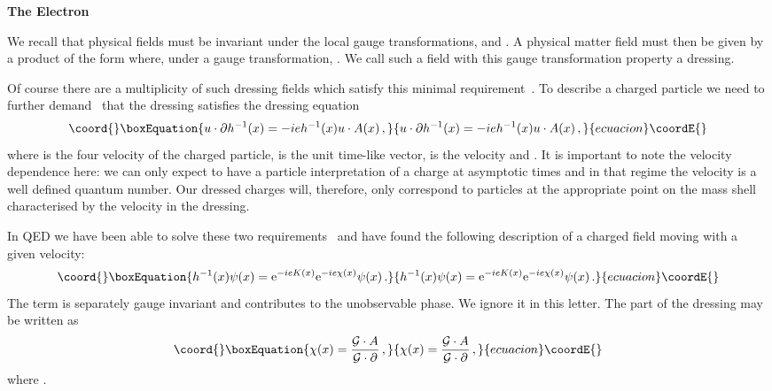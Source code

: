 \documentclass[12pt,a4paper]{article}
\providecommand{\no}{\noindent}
\providecommand{\cd}{\cdot}
\providecommand{\pa}{\partial}
\providecommand{\G}{{\cal G}}
\providecommand{\ee}{\mathrm{e}}
\providecommand{\vb}{{\boldsymbol v}}
\begin{document}
\bigskip

\noindent \no \textbf{The Electron}

\smallskip

\no We  recall that physical fields must be invariant under the local gauge
transformations, \coordHE{} and
\myHighlight{$\psi(x)\to \ee^{ie\theta(x)}\psi(x)$}\coordHE{}. A physical matter field must
then be given by a product of the form \coordHE{} where,
under a gauge transformation, \myHighlight{$h^{-1}(x)
\to h^{-1}(x) \ee^{-ie\theta(x)}$}\coordHE{}. We call such a field with this
gauge transformation property a dressing.


Of course there are a multiplicity of such dressing fields which
satisfy this minimal
requirement~\cite{Dirac:1955ca,Lavelle:1997ty}. To describe a
charged particle we need to further
demand~\cite{Bagan:1997kg} that the dressing
satisfies the dressing equation
\begin{equation}\coord{}\boxEquation{\label{4de}
  u\cd\pa h^{-1}(x)=-ieh^{-1}(x)u\cd A(x)\,,
}{u\cd\pa h^{-1}(x)=-ieh^{-1}(x)u\cd A(x)\,,
}{ecuacion}\coordE{}\end{equation}
where \coordHE{} is the four velocity of the charged particle,
\myHighlight{$\eta$}\coordHE{} is the unit time-like vector, \myHighlight{$v=(0,\vb)$}\coordHE{} is the velocity
and \myHighlight{$\gamma=(1-|\vb|^2)^{-1/2}$}\coordHE{}.
It is important to note the velocity dependence here: we can only
expect to have a particle interpretation of a charge at asymptotic
times and in that regime the velocity is a well defined quantum
number. Our dressed charges will, therefore, only correspond to particles at the
appropriate point on the mass shell characterised by the velocity in
the dressing.


In QED we have been able to solve these two
requirements~\cite{Bagan:1997kg,Bagan:1999jf} and have found the
following description of a charged field moving with a given
velocity:
\begin{equation}\coord{}\boxEquation{\label{4sol}
  h^{-1}(x)\psi(x)=\ee^{-ieK(x)}\ee^{-ie\chi(x)}\psi(x)\,.
}{h^{-1}(x)\psi(x)=\ee^{-ieK(x)}\ee^{-ie\chi(x)}\psi(x)\,.
}{ecuacion}\coordE{}\end{equation}
The \coordHE{} term is separately gauge invariant and contributes to the
unobservable phase. We ignore it in this letter. The \myHighlight{$\chi$}\coordHE{} part of the
dressing may be written as
\begin{equation}\coord{}\boxEquation{\label{4min}
  \chi(x)=\frac{\G\cd A}{\G\cd\pa}\,,
}{\chi(x)=\frac{\G\cd A}{\G\cd\pa}\,,
}{ecuacion}\coordE{}\end{equation}
where  \myHighlight{$\G^\mu=(\eta+v)^\mu(\eta-v)\cd\pa-\pa^\mu$}\coordHE{}.
\end{document}
